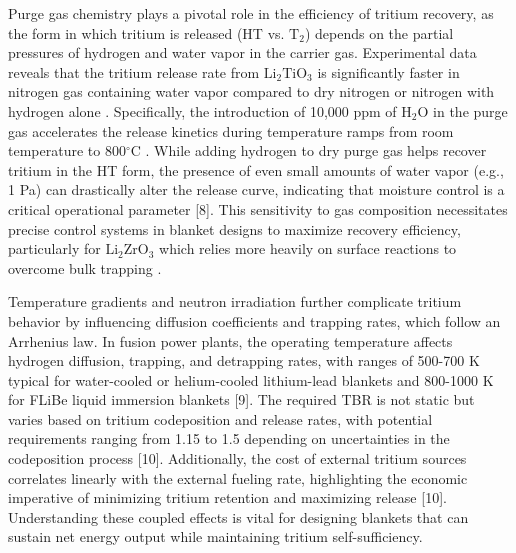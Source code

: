 \documentclass[review,12pt,a4paper]{elsarticle}
\begin{document}
\textcolor{highconf}{Purge gas chemistry plays a pivotal role in the efficiency of tritium recovery, as the form in which tritium is released (HT vs. $\mathrm{T_2}$) depends on the partial pressures of hydrogen and water vapor in the carrier gas. Experimental data reveals that the tritium release rate from $\mathrm{Li_2TiO_3}$ is significantly faster in nitrogen gas containing water vapor compared to dry nitrogen or nitrogen with hydrogen alone \citep{kanazawa_study_2011}. Specifically, the introduction of 10,000 ppm of $\mathrm{H_2O}$ in the purge gas accelerates the release kinetics during temperature ramps from room temperature to 800$^{\circ}$C \citep{kanazawa_study_2011}. While adding hydrogen to dry purge gas helps recover tritium in the HT form, the presence of even small amounts of water vapor (e.g., 1 Pa) can drastically alter the release curve, indicating that moisture control is a critical operational parameter [8]. This sensitivity to gas composition necessitates precise control systems in blanket designs to maximize recovery efficiency, particularly for $\mathrm{Li_2ZrO_3}$ which relies more heavily on surface reactions to overcome bulk trapping \citep{tanaka_blanket_2000}.}

\textcolor{highconf}{Temperature gradients and neutron irradiation further complicate tritium behavior by influencing diffusion coefficients and trapping rates, which follow an Arrhenius law. In fusion power plants, the operating temperature affects hydrogen diffusion, trapping, and detrapping rates, with ranges of 500-700 K typical for water-cooled or helium-cooled lithium-lead blankets and 800-1000 K for FLiBe liquid immersion blankets [9]. The required TBR is not static but varies based on tritium codeposition and release rates, with potential requirements ranging from 1.15 to 1.5 depending on uncertainties in the codeposition process [10]. Additionally, the cost of external tritium sources correlates linearly with the external fueling rate, highlighting the economic imperative of minimizing tritium retention and maximizing release [10]. Understanding these coupled effects is vital for designing blankets that can sustain net energy output while maintaining tritium self-sufficiency.}
\end{document}
